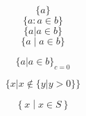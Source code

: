 \documentclass{article}
\begin{document}
\[ \{ a \} \]
\[ \{ a : a\in b \} \]
\[ \{ a | a\in b \} \]
\[ \{ a \mid a\in b \} \]

\[ \{ a | a\in b \}_{c=0} \]

\[ \{ x | x \not\in \{ y | y > 0 \} \} \]

\[ \left\{ x \middle| x\in S \right\} \]
\end{document}
